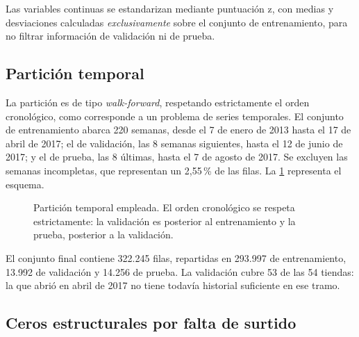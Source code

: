 Las variables continuas se estandarizan mediante puntuación z, con medias y desviaciones calculadas
\emph{exclusivamente} sobre el conjunto de entrenamiento, para no filtrar información de validación
ni de prueba.

\subsection{Partición temporal}

La partición es de tipo \emph{walk-forward}, respetando estrictamente el orden cronológico, como
corresponde a un problema de series temporales. El conjunto de entrenamiento abarca 220 semanas,
desde el 7 de enero de 2013 hasta el 17 de abril de 2017; el de validación, las 8 semanas
siguientes, hasta el 12 de junio de 2017; y el de prueba, las 8 últimas, hasta el 7 de agosto de
2017. Se excluyen las semanas incompletas, que representan un 2,55\,\% de las filas. La
\cref{fig:split} representa el esquema.

\begin{figure}[H]
  \centering
  \caption[Partición temporal \emph{walk-forward}]{Partición temporal empleada. El orden
  cronológico se respeta estrictamente: la validación es posterior al entrenamiento y la prueba,
  posterior a la validación.}
  \label{fig:split}
\end{figure}

El conjunto final contiene 322.245 filas, repartidas en 293.997 de entrenamiento, 13.992 de
validación y 14.256 de prueba. La validación cubre 53 de las 54 tiendas: la que abrió en abril de
2017 no tiene todavía historial suficiente en ese tramo.

\subsection{Ceros estructurales por falta de surtido}

